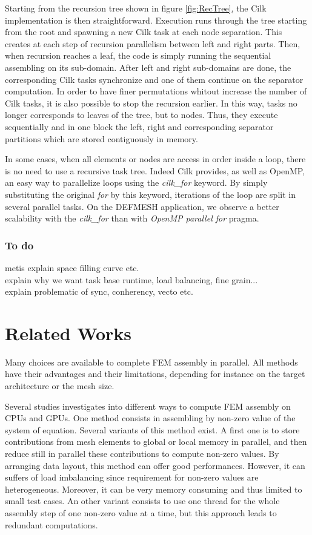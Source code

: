 \documentclass{IOS-Book-Article}
\begin{document}
Starting from the recursion tree shown in figure \ref{fig:RecTree}, the Cilk implementation is then straightforward.
Execution runs through the tree starting from the root and spawning a new Cilk task at each node separation.
This creates at each step of recursion parallelism between left and right parts.
Then, when recursion reaches a leaf, the code is simply running the sequential assembling on its sub-domain.
After left and right sub-domains are done, the corresponding Cilk tasks synchronize and one of them continue on the separator computation.
In order to have finer permutations whitout increase the number of Cilk tasks, it is also possible to stop the recursion earlier.
In this way, tasks no longer corresponds to leaves of the tree, but to nodes.
Thus, they execute sequentially and in one block the left, right and corresponding separator partitions which are stored contiguously in memory.

In some cases, when all elements or nodes are access in order inside a loop, there is no need to use a recursive task tree.
Indeed Cilk provides, as well as OpenMP, an easy way to parallelize loops using the \emph{cilk\_for} keyword.
By simply substituting the original \emph{for} by this keyword, iterations of the loop are split in several parallel tasks.
On the DEFMESH application, we observe a better scalability with the \emph{cilk\_for} than with \emph{OpenMP parallel for} pragma.

\subsubsection{To do}
metis explain space filling curve etc.\\
explain why we want task base runtime, load balancing, fine grain...\\
explain problematic of sync, conherency, vecto etc.\\

\section{Related Works}
Many choices are available to complete FEM assembly in parallel.
All methods have their advantages and their limitations, depending for instance on the target architecture or the mesh size.

Several studies \cite{Stanford,CPUGPUasm} investigates into different ways to compute FEM assembly on CPUs and GPUs.
One method consists in assembling by non-zero value of the system of equation. Several variants of this method exist.
A first one is to store contributions from mesh elements to global or local memory in parallel, and then reduce still in parallel these contributions to compute non-zero values.
By arranging data layout, this method can offer good performances. However, it can suffers of load imbalancing since requirement for non-zero values are heterogeneous.
Moreover, it can be very memory consuming and thus limited to small test cases.
An other variant consists to use one thread for the whole assembly step of one non-zero value at a time, but this approach leads to redundant computations.
\end{document}
